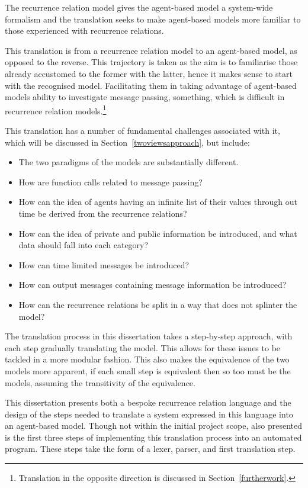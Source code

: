 \documentclass{article}
\begin{document}
The recurrence relation model gives the agent-based model a system-wide formalism and the translation seeks to make agent-based models more familiar to those experienced with recurrence relations.  

This translation is from a recurrence relation model to an agent-based model, as opposed to the reverse. This trajectory is taken as the aim is to familiarise those already accustomed to the former with the latter, hence it makes sense to start with the recognised model. Facilitating them in taking advantage of agent-based models ability to investigate message passing, something, which is difficult in recurrence relation models.\footnote{Translation in the opposite direction is discussed in Section~\ref{furtherwork}.}  

This translation has a number of fundamental challenges associated with it, which will be discussed in Section~\ref{twoviewsapproach}, but include:
\begin{itemize}
   \item The two paradigms of the models are substantially different. 
   \item How are function calls related to message passing?
   \item How can the idea of agents having an infinite list of their values through out time be derived from the recurrence relations? 
   \item How can the idea of private and public information be introduced, and what data should fall into each category? 
   \item How can time limited messages be introduced?
   \item How can output messages containing message information be introduced? 
   \item How can the recurrence relations be split in a way that does not splinter the model? 
\end{itemize}

The translation process in this dissertation takes a step-by-step approach, with each step gradually translating the model. This allows for these issues to be tackled in a more modular fashion. This also makes the equivalence of the two models more apparent, if each small step is equivalent then so too must be the models, assuming the transitivity of the equivalence. 

This dissertation presents both a bespoke recurrence relation language and the design of the steps needed to translate a system expressed in this language into an agent-based model. Though not within the initial project scope, also presented is the first three steps of implementing this translation process into an automated program. These steps take the form of a lexer, parser, and first translation step. 
\end{document}
